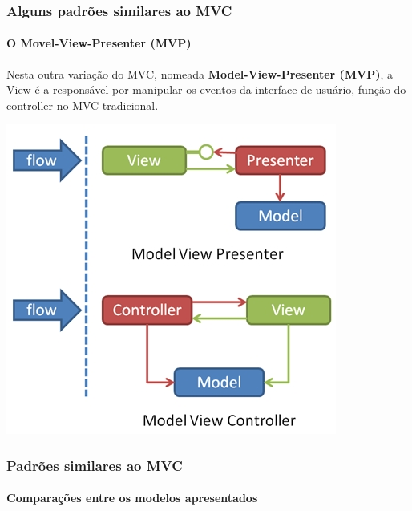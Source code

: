 \documentclass{beamer}
\begin{document}
\begin{frame}
\frametitle{Alguns padrões similares ao MVC}
\framesubtitle{O Movel-View-Presenter (MVP)}
	Nesta outra variação do MVC, nomeada \textbf{Model-View-Presenter (MVP)}, a View é a responsável por manipular os eventos da interface de usuário, função do controller no MVC tradicional.
	\begin{center}
		\includegraphics[scale=0.4]{MVP.jpg}
	\end{center}
\end{frame}

\begin{frame}
\frametitle{Padrões similares ao MVC}
\framesubtitle{Comparações entre os modelos apresentados}
\end{frame}
\end{document}
